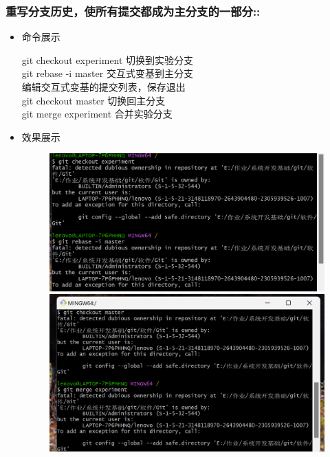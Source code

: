 \documentclass[UTF8]{ctexart}
\begin{document}
\subsubsection{重写分支历史，使所有提交都成为主分支的一部分::}
\begin{itemize}
  \item 命令展示
 
git checkout experiment       切换到实验分支\\
git rebase -i master          交互式变基到主分支\\
  编辑交互式变基的提交列表，保存退出\\
git checkout master           切换回主分支\\
git merge experiment          合并实验分支
\item 效果展示
   \begin{figure}[H]
\includegraphics[width=1\textwidth]{9}
\includegraphics[width=1\textwidth]{10}
\end{figure}
\end{itemize}
\end{document}
